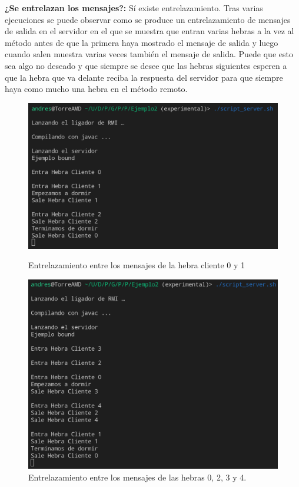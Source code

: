 \documentclass{article}
\begin{document}
\bigskip

\textbf{¿Se entrelazan los mensajes?: }Sí existe entrelazamiento. Tras varias ejecuciones se puede observar como se produce un entrelazamiento de mensajes de salida en el servidor en el que se muestra que entran varias hebras a la vez al método antes de que la primera haya mostrado el mensaje de salida y luego cuando salen muestra varias veces también el mensaje de salida. Puede que esto sea algo no deseado y que siempre se desee que las hebras siguientes esperen a que la hebra que va delante reciba la respuesta del servidor para que siempre haya como mucho una hebra en el método remoto.


\begin{figure}[H]
    \centering
    \begin{minipage}[H]{0.49\textwidth}
        \centering
        \includegraphics[width=\textwidth]{imagenes/E2Server1.png}
        \caption{Entrelazamiento entre los mensajes de la hebra cliente 0 y 1}
    \end{minipage}
    \hfill
    \begin{minipage}[H]{0.49\textwidth}
        \centering
        \includegraphics[width=\textwidth]{imagenes/E2Server2.png}
        \caption{Entrelazamiento entre los mensajes de las hebras 0, 2, 3 y 4.}
    \end{minipage}
\end{figure}
\end{document}
